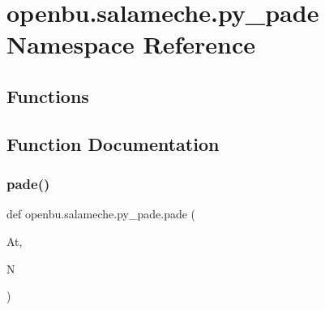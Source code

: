 \hypertarget{namespaceopenbu_1_1salameche_1_1py__pade}{}\section{openbu.\+salameche.\+py\+\_\+pade Namespace Reference}
\label{namespaceopenbu_1_1salameche_1_1py__pade}
\subsection*{Functions}


\subsection{Function Documentation}
\mbox{\label{namespaceopenbu_1_1salameche_1_1py__pade_a0d8540294393c80f6ed2cb7eb6f5e4e0}} 
\subsubsection{\texorpdfstring{pade()}{pade()}}
{\footnotesize\ttfamily def openbu.\+salameche.\+py\+\_\+pade.\+pade (\begin{DoxyParamCaption}\item[{}]{At,  }\item[{}]{N }\end{DoxyParamCaption})}

